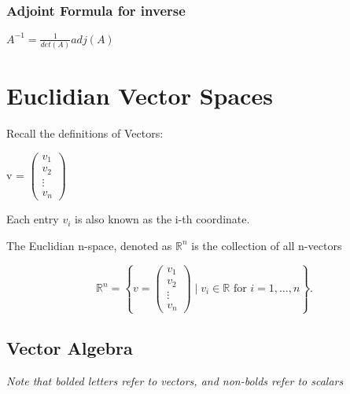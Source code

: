 \documentclass{article}
\begin{document}
\subsubsection{Adjoint Formula for inverse}
\begin{center}
    $A^{-1} = \frac{1}{det(A)}adj(A)$
\end{center}

\section{Euclidian Vector Spaces}
Recall the definitions of Vectors:

v = $\begin{pmatrix}
    v_1\\
    v_2\\
    \vdots\\
    v_n
\end{pmatrix}$

Each entry $v_i$ is also known as the i-th coordinate.

The Euclidian n-space, denoted as $\mathbb{R}^n$ is the collection of all n-vectors

\[
\mathbb{R}^n = \left\{
v = \begin{pmatrix}
v_1 \\
v_2 \\
\vdots \\
v_n
\end{pmatrix} \mid v_i \in \mathbb{R} \text{ for } i = 1, \dots, n
\right\}.
\]

\subsection{Vector Algebra}
\textit{Note that bolded letters refer to vectors, and non-bolds refer to scalars}
\end{document}

